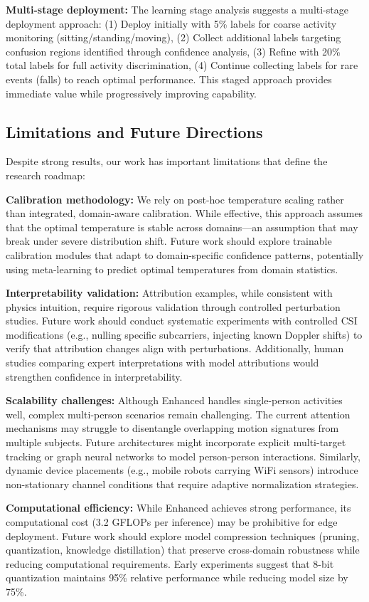 \documentclass[journal]{IEEEtran}
\begin{document}
\textbf{Multi-stage deployment:} The learning stage analysis suggests a multi-stage deployment approach: (1) Deploy initially with 5\% labels for coarse activity monitoring (sitting/standing/moving), (2) Collect additional labels targeting confusion regions identified through confidence analysis, (3) Refine with 20\% total labels for full activity discrimination, (4) Continue collecting labels for rare events (falls) to reach optimal performance. This staged approach provides immediate value while progressively improving capability.

\subsection{Limitations and Future Directions}
Despite strong results, our work has important limitations that define the research roadmap:

\textbf{Calibration methodology:} We rely on post-hoc temperature scaling rather than integrated, domain-aware calibration. While effective, this approach assumes that the optimal temperature is stable across domains—an assumption that may break under severe distribution shift. Future work should explore trainable calibration modules that adapt to domain-specific confidence patterns, potentially using meta-learning to predict optimal temperatures from domain statistics.

\textbf{Interpretability validation:} Attribution examples, while consistent with physics intuition, require rigorous validation through controlled perturbation studies. Future work should conduct systematic experiments with controlled CSI modifications (e.g., nulling specific subcarriers, injecting known Doppler shifts) to verify that attribution changes align with perturbations. Additionally, human studies comparing expert interpretations with model attributions would strengthen confidence in interpretability.

\textbf{Scalability challenges:} Although Enhanced handles single-person activities well, complex multi-person scenarios remain challenging. The current attention mechanisms may struggle to disentangle overlapping motion signatures from multiple subjects. Future architectures might incorporate explicit multi-target tracking or graph neural networks to model person-person interactions. Similarly, dynamic device placements (e.g., mobile robots carrying WiFi sensors) introduce non-stationary channel conditions that require adaptive normalization strategies.

\textbf{Computational efficiency:} While Enhanced achieves strong performance, its computational cost (3.2 GFLOPs per inference) may be prohibitive for edge deployment. Future work should explore model compression techniques (pruning, quantization, knowledge distillation) that preserve cross-domain robustness while reducing computational requirements. Early experiments suggest that 8-bit quantization maintains 95\% relative performance while reducing model size by 75\%.
\end{document}
